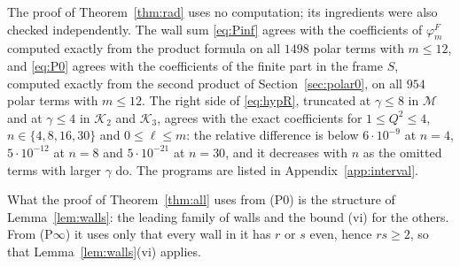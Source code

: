 \begin{remark}\label{rem:numerics}
The proof of Theorem~\ref{thm:rad} uses no computation; its ingredients were also checked independently. The wall sum \eqref{eq:Pinf} agrees with the coefficients of $\varphi^F_m$ computed exactly from the product formula on all $1498$ polar terms with $m\le12$, and \eqref{eq:P0} agrees with the coefficients of the finite part in the frame $S$, computed exactly from the second product of Section~\ref{sec:polar0}, on all $954$ polar terms with $m\le12$. The right side of \eqref{eq:hypR}, truncated at $\gamma\le8$ in $\mathcal M$ and at $\gamma\le4$ in $\mathcal K_2$ and $\mathcal K_3$, agrees with the exact coefficients for $1\le Q^2\le4$, $n\in\{4,8,16,30\}$ and $0\le\ell\le m$: the relative difference is below $6\cdot10^{-9}$ at $n=4$, $5\cdot10^{-12}$ at $n=8$ and $5\cdot10^{-21}$ at $n=30$, and it decreases with $n$ as the omitted terms with larger $\gamma$ do. The programs are listed in Appendix~\ref{app:interval}.
\end{remark}

\begin{remark}
What the proof of Theorem~\ref{thm:all} uses from (P0) is the structure of Lemma~\ref{lem:walls}: the leading family of walls and the bound (vi) for the others. From (P$\infty$) it uses only that every wall in it has $r$ or $s$ even, hence $rs\ge2$, so that Lemma~\ref{lem:walls}(vi) applies.
\end{remark}
